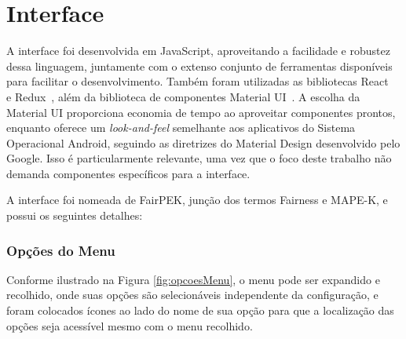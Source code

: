 \documentclass[portugues]{ic-tese}
\begin{document}
\section{Interface}
\label{sec:interface}

A interface foi desenvolvida em JavaScript, aproveitando a facilidade e robustez dessa linguagem, juntamente com o extenso conjunto de ferramentas disponíveis para facilitar o desenvolvimento. Também foram utilizadas as bibliotecas React~\citep{React_2023} e Redux~\citep{Redux_2023}, além da biblioteca de componentes Material UI~\citep{MaterialUI_2023}. A escolha da Material UI proporciona economia de tempo ao aproveitar componentes prontos, enquanto oferece um \textit{look-and-feel} semelhante aos aplicativos do Sistema Operacional Android, seguindo as diretrizes do Material Design desenvolvido pelo Google. Isso é particularmente relevante, uma vez que o foco deste trabalho não demanda componentes específicos para a interface.

A interface foi nomeada de FairPEK, junção dos termos Fairness e MAPE-K, e possui os seguintes detalhes:

\subsubsection{Opções do Menu}

Conforme ilustrado na Figura \ref{fig:opcoesMenu}, o menu pode ser expandido e recolhido, onde suas opções são selecionáveis independente da configuração, e foram colocados ícones ao lado do nome de sua opção para que a localização das opções seja acessível mesmo com o menu recolhido.
\end{document}
